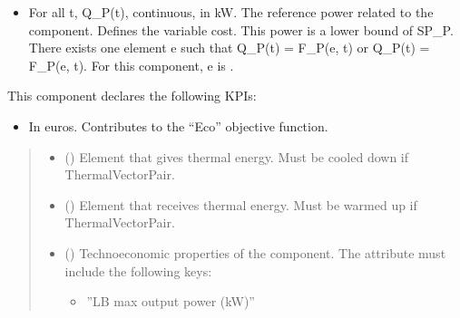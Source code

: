 \documentclass[letterpaper,10pt,english]{sphinxmanual}
\begin{document}
\begin{fulllineitems}
\begin{fulllineitems}
\begin{itemize}
\item {} 
\sphinxAtStartPar
For all t, Q\_P(t), continuous, in kW.
The reference power related to the component. Defines the variable cost.
This power is a lower bound of SP\_P.
There exists one element e such that Q\_P(t) = F\_P(e, t) or Q\_P(t) = \sphinxhyphen{} F\_P(e, t).
For this component, e is .

\end{itemize}

\sphinxAtStartPar
This component declares the following KPIs:
\begin{itemize}
\item {} 
\sphinxAtStartPar
{}
In euros.
Contributes to the “Eco” objective function.

\end{itemize}
\begin{quote}\begin{description}
\begin{itemize}
\item {} 
\sphinxAtStartPar
{} () \textendash{} Element that gives thermal energy.
Must be cooled down if ThermalVectorPair.

\item {} 
\sphinxAtStartPar
{} () \textendash{} Element that receives thermal energy.
Must be warmed up if ThermalVectorPair.

\item {} 
\sphinxAtStartPar
{} (\sphinxstyleliteralemphasis{\sphinxupquote{ | }}) \textendash{} 
\sphinxAtStartPar
Techno\sphinxhyphen{}economic properties of the component.
The  attribute must include the following keys:
\begin{itemize}
\item {} 
\sphinxAtStartPar
”LB max output power (kW)”


\end{itemize}
\end{itemize}
\end{description}
\end{quote}
\end{fulllineitems}
\end{fulllineitems}
\end{document}
